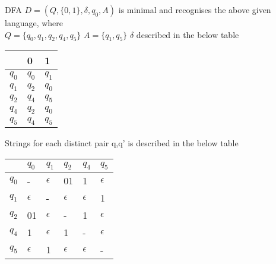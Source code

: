 \begin{soln}
DFA $D=(Q,\{0,1\},\delta,q_0,A)$ is minimal and recognises the above given language, where\\

$Q=\{q_0,q_1,q_2,q_4,q_5\}$
\newline $A=\{q_1,q_5\}$
\newline $\delta$ described in the below table

\begin{center}
\begin{tabular}{|l|l|l|}
\hline
 & 0 & 1 \\
\hline
$q_0$ & $q_0$ & $q_1$  \\
\hline
$q_1$ & $q_2$ & $q_0$  \\
\hline
$q_2$ & $q_4$ & $q_5$  \\
\hline
$q_4$ & $q_2$ & $q_0$  \\
\hline
$q_5$ & $q_4$ & $q_5$  \\
\hline
\end{tabular}
\end{center}

Strings for each distinct pair q,q' is described in the below table
\begin{center}
\begin{tabular}{|l|l|l|l|l|l|}
\hline
 & $q_0$ & $q_1$ &$q_2$& $q_4$ & $q_5$\\
\hline
$q_0$ & - & $\epsilon$ & 01 & 1& $\epsilon$  \\
\hline
$q_1$  & $\epsilon$  & - & $\epsilon$ & $\epsilon$ & 1  \\
\hline
$q_2$  & 01 & $\epsilon$ & - & 1& $\epsilon$  \\
\hline
$q_4$  & 1 & $\epsilon$ & 1 & -& $\epsilon$  \\
\hline
$q_5$  & $\epsilon$ & 1 & $\epsilon$ & $\epsilon$ & -  \\
\hline
\end{tabular}
\end{center}




\end{soln}